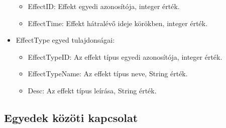 \begin{itemize}
    \begin{itemize}
        \item EffectID: Effekt egyedi azonosítója, integer érték.
        \item EffectTime: Effekt hátralévő ideje körökben, integer érték.
    \end{itemize}

    \item EffectType egyed tulajdonságai:

    \begin{itemize}
        \item EffectTypeID: Az effekt típus egyedi azonosítója, integer érték.
        \item EffectTypeName: Az effekt típus neve, String érték.
        \item Desc: Az effekt típus leírása, String érték.
    \end{itemize}

\end{itemize}

\subsection{Egyedek közöti kapcsolat}

